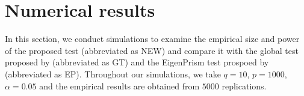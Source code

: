 \documentclass[11pt]{article}
\theoremstyle{plain}
\theoremstyle{definition}
\theoremstyle{remark}
\begin{document}




\section{Numerical results}\label{sec:Numerical}

In this section, we conduct simulations to examine the empirical size and power of the proposed test
(abbreviated as NEW) 
and compare it with the global test proposed by \cite{Goeman2006} (abbreviated as GT) and the EigenPrism test prospoed by \cite{Janson2016} (abbreviated as EP).
Throughout our simulations, we take $q=10$, $p=1000$, $\alpha=0.05$ and the empirical results are obtained from $5000$ replications.
\end{document}
